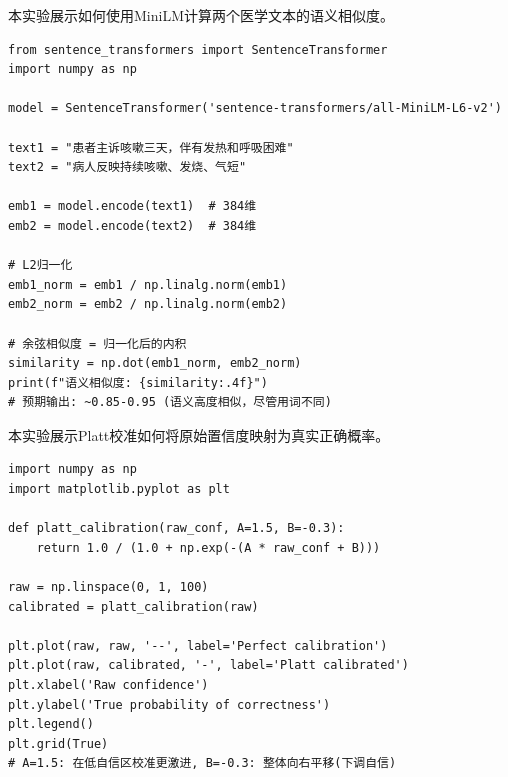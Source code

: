 \documentclass[11pt,a4paper]{ctexart}
\begin{document}
\begin{codebox}[实验3：构建MiniLM嵌入并计算语义相似度]
本实验展示如何使用MiniLM计算两个医学文本的语义相似度。
\small
\begin{verbatim}
from sentence_transformers import SentenceTransformer
import numpy as np

model = SentenceTransformer('sentence-transformers/all-MiniLM-L6-v2')

text1 = "患者主诉咳嗽三天，伴有发热和呼吸困难"
text2 = "病人反映持续咳嗽、发烧、气短"

emb1 = model.encode(text1)  # 384维
emb2 = model.encode(text2)  # 384维

# L2归一化
emb1_norm = emb1 / np.linalg.norm(emb1)
emb2_norm = emb2 / np.linalg.norm(emb2)

# 余弦相似度 = 归一化后的内积
similarity = np.dot(emb1_norm, emb2_norm)
print(f"语义相似度: {similarity:.4f}")
# 预期输出: ~0.85-0.95 (语义高度相似，尽管用词不同)
\end{verbatim}
\normalsize
\end{codebox}

\begin{codebox}[实验4：Platt校准可视化]
本实验展示Platt校准如何将原始置信度映射为真实正确概率。
\small
\begin{verbatim}
import numpy as np
import matplotlib.pyplot as plt

def platt_calibration(raw_conf, A=1.5, B=-0.3):
    return 1.0 / (1.0 + np.exp(-(A * raw_conf + B)))

raw = np.linspace(0, 1, 100)
calibrated = platt_calibration(raw)

plt.plot(raw, raw, '--', label='Perfect calibration')
plt.plot(raw, calibrated, '-', label='Platt calibrated')
plt.xlabel('Raw confidence')
plt.ylabel('True probability of correctness')
plt.legend()
plt.grid(True)
# A=1.5: 在低自信区校准更激进, B=-0.3: 整体向右平移(下调自信)
\end{verbatim}
\normalsize
\end{codebox}
\end{document}
